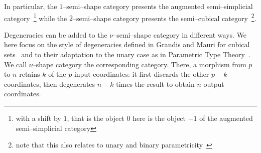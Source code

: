 \documentclass[a4paper,UKenglish,cleveref,autoref]{lipics-v2021}
\begin{document}
In particular, the $1$--semi--shape category presents the augmented semi--simplicial category~\footnote{with a shift by $1$, that is the object $0$ here is the object $-1$ of the augmented semi--simplicial category} while the $2$--semi--shape category presents the semi--cubical category~\footnote{note that this also relates to unary and binary parametricity~\cite{bernardy15, reynolds83}}.

Degeneracies can be added to the $\nu$--semi--shape category in different ways. We here focus on the style of degeneracies defined in Grandis and Mauri for cubical sets~\cite{grandis03} and to their adaptation to the unary case as in Parametric Type Theory~\cite{bernardy15}. We call $\nu$--shape category the corresponding category. There, a morphism from $p$ to $n$ retains $k$ of the $p$ input coordinates: it first discards the other $p-k$ coordinates, then degenerates $n-k$ times the result to obtain $n$ output coordinates.
\end{document}
